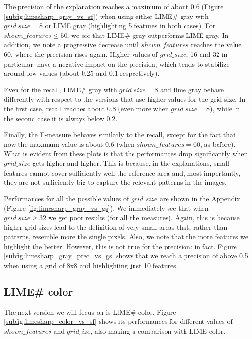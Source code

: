 \documentclass[12pt, twoside, a4paper]{report}
\begin{document}
The precision of the explanation reaches a maximum of about 0.6 (Figure \ref{subfig:limesharp_gray_vs_sf}) when using either LIME\# gray with $grid\_size = 8$ or LIME gray (highlighting 5 features in both cases). For $shown\_features \leq 50$, we see that LIME\# gray outperforms LIME gray. In addition, we note a progressive decrease until $shown\_features$ reaches the value 60, where the precision rises again. 
Higher values of $grid\_size$, 16 and 32 in particular, have a negative impact on the precision, which tends to stabilize around low values (about 0.25 and 0.1 respectively).

Even for the recall, LIME\# gray with $grid\_size=8$ and lime gray behave differently with respect to the versions that use higher values for the grid size. In the first case, recall reaches about 0.8 (even more when $grid\_size = 8$), while in the second case it is always below 0.2.

Finally, the F-measure behaves similarly to the recall, except for the fact that now the maximum value is about 0.6 (when $shown\_features = 60$, as before). What is evident from these plots is that the performances drop significantly when $grid\_size$ gets higher and higher. This is because, in the explanations, small features cannot cover sufficiently well the reference area and, most importantly, they are not sufficiently big to capture the relevant patterns in the images.
\bigskip

Performances for all the possible values of $grid\_size$ are shown in the Appendix (Figure \ref{fig:limesharp_gray_vs_gs}). We immediately see that when $grid\_size \geq 32$ we get poor results (for all the measures). Again, this is because higher grid sizes lead to the definition of very small areas that, rather than patterns, resemble more the single pixels.
Also, we note that the more features we highlight the better. However, this is not true for the precision: in fact, Figure \ref{subfig:limesharp_gray_prec_vs_gs} shows that we reach a precision of above 0.5 when using a grid of 8x8 and highlighting just 10 features.

\subsection{LIME\# color}

The next version we will focus on is LIME\# color. Figure \ref{subfig:limesharp_color_vs_sf} shows its performances for different values of $shown\_features$ and $grid_size$, also making a comparison with LIME color.
\end{document}
